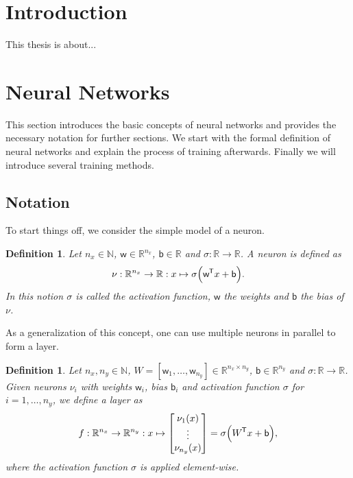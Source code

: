 \documentclass[11pt, a4paper]{article}
\newtheorem{definition}[theorem]{Definition}
\newcommand{\N}{\mathbb{N}}
\newcommand{\R}{\mathbb{R}}
\renewcommand{\b}{\mathsf{b}}
\newcommand{\w}{\mathsf{w}}
\newcommand*{\tr}{^{\mkern-1.5mu\mathsf{T}}}
\begin{document}
\tableofcontents
\thispagestyle{empty}

\pagebreak
\section{Introduction}

This thesis is about...

\pagebreak
\section{Neural Networks}

This section introduces the basic concepts of neural networks and provides the necessary notation for further sections. We start with the formal definition of neural networks and explain the process of training afterwards. Finally we will introduce several training methods.

\subsection{Notation} \label{sec:notation}

To start things off, we consider the simple model of a neuron. 

\begin{definition}
Let $n_x \in \N$, $\w \in \R^{n_x}$, $\b \in \R$ and $\sigma: \R \to \R$. A neuron is defined as
\[ \nu : \R^{n_x} \to \R : x \mapsto \sigma \Big ( \w \tr x + \b \Big ).\] %
In this notion $\sigma$ is called the activation function, $\w$ the weights and $\b$ the bias of $\nu$.
\end{definition}

As a generalization of this concept, one can use multiple neurons in parallel to form a layer.

\begin{definition}  \label{def:layer}
Let $n_x, n_y \in \N$, $W = [\w_1, \dots, \w_{n_y}] \in \R^{n_x \times n_y}$, $\b \in \R^{n_y}$ and $\sigma : \R \to \R$. Given neurons $\nu_i$ with weights $\w_i$, bias $\b_i$ and activation function $\sigma$ for $i=1, \dots, n_y$, we define a layer as
\[ f : \R^{n_x} \to \R^{n_y} : x \mapsto \begin{bmatrix} \nu_1(x) \\ \vdots \\ \nu_{n_y}(x) \end{bmatrix} = \sigma \Big ( W\tr x + \b \Big ), \]
where the activation function $\sigma$ is applied element-wise.
\end{definition}
\end{document}
